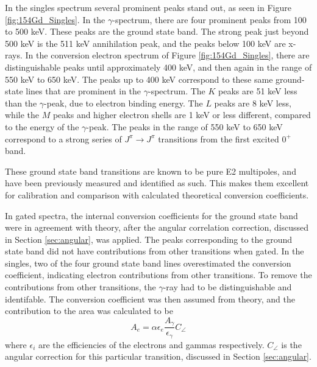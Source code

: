 In the singles spectrum several prominent peaks stand out, as seen in Figure \ref{fig:154Gd_Singles}. In the $\gamma$-spectrum, there are four prominent peaks from 100 to 500 keV. These peaks are the ground state band. The strong peak just beyond 500 keV is the 511 keV annihilation peak, and the peaks below 100 keV are x-rays. In the conversion electron spectrum of Figure \ref{fig:154Gd_Singles}, there are distinguishable peaks until approximately 400 keV, and then again in the range of 550 keV to 650 keV. The peaks up to 400 keV correspond to these same ground-state lines that are prominent in the $\gamma$-spectrum. The $K$ peaks are 51 keV less than the $\gamma$-peak, due to electron binding energy. The $L$ peaks are 8 keV less, while the $M$ peaks and higher electron shells are 1 keV or less different, compared to the energy of the $\gamma$-peak. The peaks in the range of 550 keV to 650 keV correspond to a strong series of $J^{\pi}\rightarrow J^{\pi}$ transitions from the first excited $0^+$ band.

\afterpage{\clearpage}

These ground state band transitions are known to be pure E2 multipoles, and have been previously measured and identified as such. This makes them excellent for calibration and comparison with calculated theoretical conversion coefficients.

In gated spectra, the internal conversion coefficients for the ground state band were in agreement with theory, after the angular correlation correction, discussed in Section \ref{sec:angular}, was applied. The peaks corresponding to the ground state band did not have contributions from other transitions when gated. In the singles, two of the four ground state band lines overestimated the conversion coefficient, indicating electron contributions from other transitions.  To remove the contributions from other transitions, the $\gamma$-ray had to be distinguishable and identifable. The conversion coefficient was then assumed from theory, and the contribution to the area was calculated to be
\begin{equation}
    \label{eq:ICC_Subtract}
    A_{e} = \alpha \epsilon_{e} \frac{A_{\gamma}}{\epsilon_{\gamma}} C_{\angle}
\end{equation}
where $\epsilon_{i}$ are the efficiencies of the electrons and gammas respectively. $C_{\angle}$ is the angular correction for this particular transition, discussed in Section \ref{sec:angular}.

